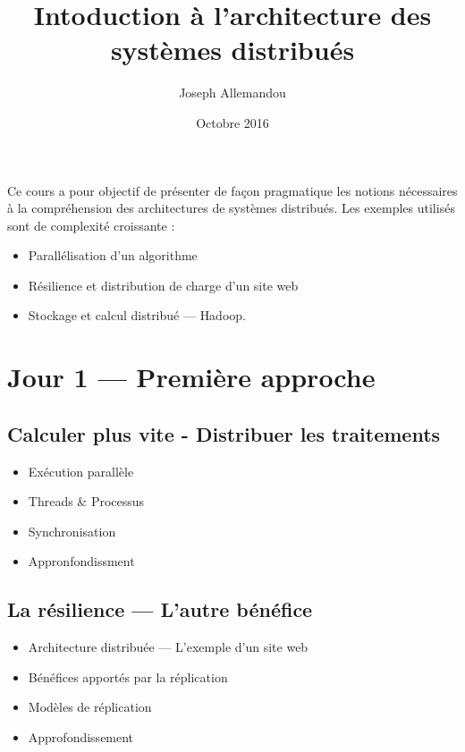 \documentclass[utf8,12pt,draft]{article}
\begin{document}

\title{\LARGE\bfseries Intoduction \`a l'architecture des syst\`emes distribu\'es}
\author{Joseph Allemandou}
\date{Octobre 2016}
\maketitle

Ce cours a pour objectif de pr\'esenter de fa\c{c}on pragmatique les notions
n\'ecessaires \`a la compr\'ehension des architectures de syst\`emes
distribu\'es. Les exemples utilis\'es sont de complexit\'e croissante :
\begin{itemize}
\item Parall\'elisation d'un algorithme
\item R\'esilience et distribution de charge d'un site web
\item Stockage et calcul distribu\'e --- {\sc Hadoop}.
\end{itemize}

\section{Jour 1 --- Premi\`ere approche}

\subsection{Calculer plus vite - Distribuer les traitements}
\begin{itemize}
\item Ex\'ecution parall\`ele \cite{wikipara} \cite{wikiconcur} \cite{wikimultitache}
\item Threads \& Processus\cite{wikithread} \cite{wikiproc}
\item Synchronisation \cite{wikisync} \cite{wikideadlock}
\item Appronfondissment \cite{wikiordo} \cite{wikicomproc} \cite{wikiverrou}
                        \cite{wikisema} \cite{wikiexclu} \cite{wikisection}
                        \cite{wikiprodcons} \cite{wikilectred}
\end{itemize}


\subsection{La r\'esilience --- L'autre b\'en\'efice}
\begin{itemize}
\item Architecture distribu\'ee \cite{wikiarchidist} --- L'exemple d'un site web
\item B\'en\'efices apport\'es par la r\'eplication \cite{wikirepli} \cite{wikispof} \cite{wikiloadbal}
\item Mod\`eles de r\'eplication \cite{wikimasterslave} \cite{wikimultimaster}
\item Approfondissement \cite{wikicap} \cite{wikiconsensus} \cite{wikipaxos}
                        \cite{wikisplitbrain}
\end{itemize}
\end{document}
